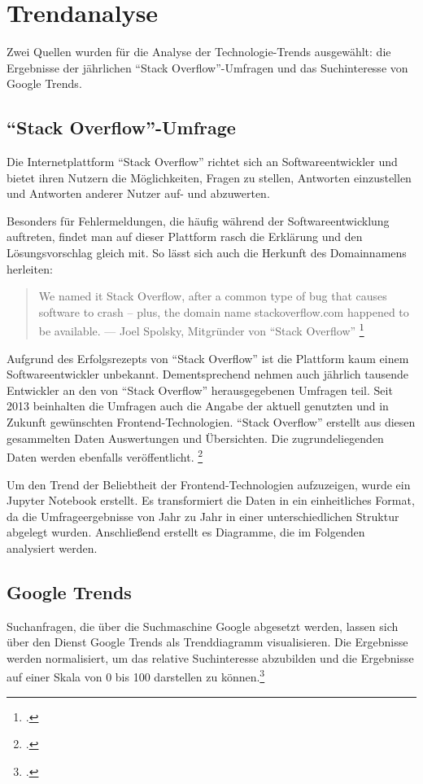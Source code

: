 \section{Trendanalyse}
\label{sec:Trendanalyse}


Zwei Quellen wurden für die Analyse der Technologie-Trends ausgewählt: die Ergebnisse der jährlichen \enquote{Stack Overflow}-Umfragen und das Suchinteresse von Google Trends.

\subsection{\enquote{Stack Overflow}-Umfrage}
Die Internetplattform \enquote{Stack Overflow} richtet sich an Softwareentwickler und bietet ihren Nutzern die Möglichkeiten, Fragen zu stellen, Antworten einzustellen und Antworten anderer Nutzer auf- und abzuwerten.

Besonders für Fehlermeldungen, die häufig während der Softwareentwicklung auftreten, findet man auf dieser Plattform rasch die Erklärung und den Lösungsvorschlag gleich mit.
So lässt sich auch die Herkunft des Domainnamens herleiten:

\begin{quotation}
We named it Stack Overflow, after a common type of bug that causes software to crash -- plus, the domain name stackoverflow.com happened to be available. --- Joel Spolsky, Mitgründer von \enquote{Stack Overflow} \footcite[][]{TheUnprovenPath}
\end{quotation}

Aufgrund des Erfolgsrezepts von \enquote{Stack Overflow} ist die Plattform kaum einem Softwareentwickler unbekannt.
Dementsprechend nehmen auch jährlich tausende Entwickler an den von \enquote{Stack Overflow} herausgegebenen Umfragen teil.
Seit  2013 beinhalten die Umfragen auch die Angabe der aktuell genutzten und in Zukunft gewünschten Frontend-Technologien.
\enquote{Stack Overflow} erstellt aus diesen gesammelten Daten Auswertungen und Übersichten. Die zugrundeliegenden Daten werden ebenfalls veröffentlicht.
\footcite[Vgl.][]{StackOverflowInsights} 

Um den Trend der Beliebtheit der Frontend-Technologien aufzuzeigen, wurde ein Jupyter Notebook erstellt.
Es transformiert die Daten in ein einheitliches Format, da die  Umfrageergebnisse von Jahr zu Jahr in einer unterschiedlichen Struktur abgelegt wurden.
Anschließend erstellt es Diagramme, die im Folgenden analysiert werden.

\subsection{Google Trends} Suchanfragen, die über die Suchmaschine Google abgesetzt werden, lassen sich  über den Dienst Google Trends  als Trenddiagramm visualisieren.
Die Ergebnisse werden normalisiert, um das relative Suchinteresse abzubilden und die Ergebnisse auf einer Skala von 0 bis 100 darstellen zu können.\footcite[Vgl.][]{GoogleTrendsHilfe}

